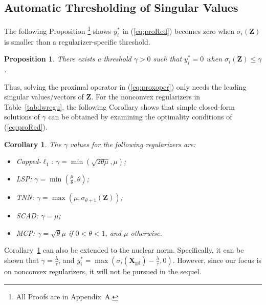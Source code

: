 \documentclass[10pt,journal,compsoc]{IEEEtran}
\newtheorem{prop}[theorem]{Proposition}
\newtheorem{corollary}[theorem]{Corollary}
\newcommand{\X}{\mathbf{X}}
\begin{document}

\subsection{Automatic Thresholding of Singular Values}
\label{sec:auto}

The following 
Proposition 
\footnote{All Proofs are in Appendix~A.}
shows $y_i^*$
in (\ref{eq:proRed}) becomes zero when
$\sigma_i(\mathbf{Z})$ is smaller than a regularizer-specific threshold. 

\begin{prop}
\label{pr:proxSolution} 
There exists a threshold $\gamma > 0$
such that 
$y^*_i = 0$
when $\sigma_i(\mathbf{Z}) \le \gamma$.
\end{prop} 

Thus, solving the proximal operator in (\ref{eq:proxoper}) only needs the leading singular values/vectors of $\mathbf{Z}$.
For the nonconvex regularizers in Table~\ref{tab:lwregu}, the following
Corollary shows that
simple closed-form solutions  of $\gamma$ can be obtained 
by examining the optimality conditions of (\ref{eq:proRed}).

\begin{corollary} \label{cor:threh} 
The $\gamma$   values 
for the following regularizers 
are:
\begin{itemize}
\item 
Capped-$\ell_1$: $\gamma = \min\left(\sqrt{2\theta \mu}, \mu\right)$;

\item LSP: $\gamma=\min\left(\frac{\mu}{\theta},\theta\right)$; 

\item TNN: $\gamma = \max\left(\mu, \sigma_{\theta + 1}(\mathbf{Z})\right)$;

\item SCAD: $\gamma = \mu$;

\item MCP: $\gamma = \sqrt{\theta} \mu$ if $0 < \theta < 1$, and $\mu$ otherwise.
\end{itemize}
\end{corollary} 
Corollary~\ref{cor:threh} can also be extended to the nuclear norm. 
Specifically,
it can be shown that $\gamma= \frac{\lambda}{\tau}$,
and $y_i^*=\max\left( \sigma_i(\X_{\text{gd}}) - \frac{\lambda}{\tau}, 0 \right)$.
However, since our focus is on nonconvex regularizers,  
it will not be pursued in the sequel.
\end{document}
